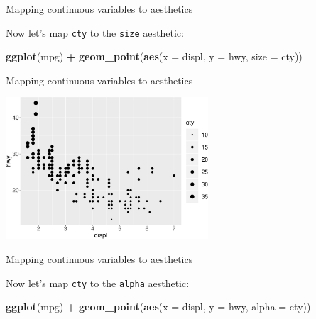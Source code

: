 \documentclass[ignorenonframetext,]{beamer}
\newenvironment{Shaded}{\begin{snugshade}}{\end{snugshade}}
\newcommand{\DataTypeTok}[1]{\textcolor[rgb]{0.13,0.29,0.53}{#1}}
\newcommand{\KeywordTok}[1]{\textcolor[rgb]{0.13,0.29,0.53}{\textbf{#1}}}
\newcommand{\NormalTok}[1]{#1}
\newcommand{\OperatorTok}[1]{\textcolor[rgb]{0.81,0.36,0.00}{\textbf{#1}}}
\newcommand{\StringTok}[1]{\textcolor[rgb]{0.31,0.60,0.02}{#1}}
\begin{document}
\begin{frame}[fragile]{Mapping continuous variables to aesthetics}
\protect\hypertarget{mapping-continuous-variables-to-aesthetics-3}{}

Now let's map \texttt{cty} to the \texttt{size} aesthetic:

\begin{Shaded}
\begin{Highlighting}[]
\KeywordTok{ggplot}\NormalTok{(mpg) }\OperatorTok{+}\StringTok{ }
\StringTok{  }\KeywordTok{geom_point}\NormalTok{(}\KeywordTok{aes}\NormalTok{(}\DataTypeTok{x =}\NormalTok{ displ, }\DataTypeTok{y =}\NormalTok{ hwy, }\DataTypeTok{size =}\NormalTok{ cty))}
\end{Highlighting}
\end{Shaded}

\end{frame}

\begin{frame}{Mapping continuous variables to aesthetics}
\protect\hypertarget{mapping-continuous-variables-to-aesthetics-4}{}

\begin{center}\includegraphics[height=200px]{data-visualization_files/figure-beamer/unnamed-chunk-24-1} \end{center}

\end{frame}

\begin{frame}[fragile]{Mapping continuous variables to aesthetics}
\protect\hypertarget{mapping-continuous-variables-to-aesthetics-5}{}

Now let's map \texttt{cty} to the \texttt{alpha} aesthetic:

\begin{Shaded}
\begin{Highlighting}[]
\KeywordTok{ggplot}\NormalTok{(mpg) }\OperatorTok{+}\StringTok{ }
\StringTok{  }\KeywordTok{geom_point}\NormalTok{(}\KeywordTok{aes}\NormalTok{(}\DataTypeTok{x =}\NormalTok{ displ, }\DataTypeTok{y =}\NormalTok{ hwy, }\DataTypeTok{alpha =}\NormalTok{ cty)) }
\end{Highlighting}
\end{Shaded}

\end{frame}
\end{document}
